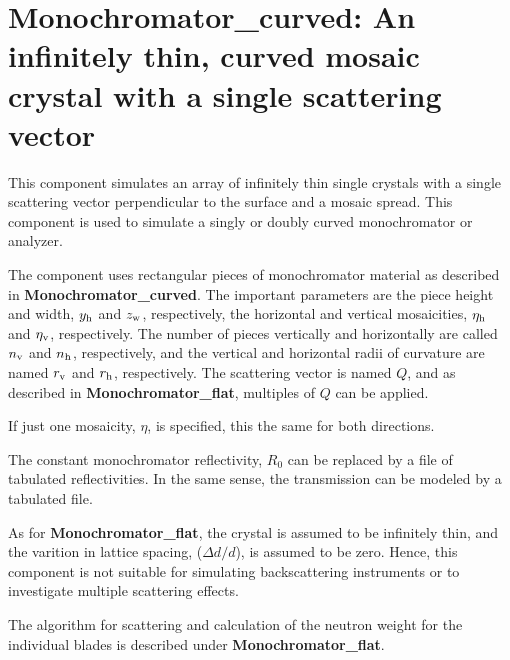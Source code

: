 
\section{Monochromator\_curved: An infinitely thin, curved mosaic crystal with
a single scattering vector}
\label{s:monochromator_curved}



This component simulates an array of infinitely thin single
crystals with a single scattering vector perpendicular to the
surface and a mosaic spread.
This component is used to simulate a singly or doubly
curved monochromator or analyzer.

The component uses  rectangular pieces of monochromator material
as described in {\bf Monochromator\_curved}.
The important parameters are the piece height and width,
$y_{\rm h}$ and $z_{\rm w}$, respectively, the
horizontal and vertical mosaicities, $\eta_{\rm h}$ and $\eta_{\rm v}$,
respectively. The number of pieces vertically and horizontally are called
$n_{\rm v}$ and $n_{\rm h}$, respectively, and the vertical and horizontal
radii of curvature are named $r_{\rm v}$ and $r_{\rm h}$, respectively.
The scattering vector is named $Q$, and as described in
{\bf Monochromator\_flat}, multiples of $Q$ can be applied.

If just one mosaicity, $\eta$, is specified, this the same for
both directions.

The constant monochromator reflectivity, $R_0$ can be replaced by
a file of tabulated reflectivities. In the same sense, the transmission
can be modeled by a tabulated file.

As for {\bf Monochromator\_flat}, the crystal is assumed to be infinitely
thin, and the varition in lattice spacing, ($\Delta d/d$),
is assumed to be zero. Hence, this
component is not suitable for simulating backscattering instruments or to
investigate multiple scattering effects.

The algorithm for scattering and calculation of the neutron weight for
the individual blades is described under {\bf Monochromator\_flat}.